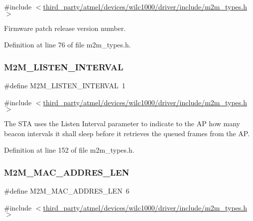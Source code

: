 {\ttfamily \#include $<$\hyperlink{m2m__types_8h}{third\+\_\+party/atmel/devices/wilc1000/driver/include/m2m\+\_\+types.\+h}$>$}

Firmware patch release version number. 

Definition at line 76 of file m2m\+\_\+types.\+h.

\mbox{\label{group__WlanDefines_gaeba577f0df70feddc9d2a3e6269ae859}} 
\subsubsection{\texorpdfstring{M2\+M\+\_\+\+L\+I\+S\+T\+E\+N\+\_\+\+I\+N\+T\+E\+R\+V\+AL}{M2M\_LISTEN\_INTERVAL}}
{\footnotesize\ttfamily \#define M2\+M\+\_\+\+L\+I\+S\+T\+E\+N\+\_\+\+I\+N\+T\+E\+R\+V\+AL~1}



{\ttfamily \#include $<$\hyperlink{m2m__types_8h}{third\+\_\+party/atmel/devices/wilc1000/driver/include/m2m\+\_\+types.\+h}$>$}

The S\+TA uses the Listen Interval parameter to indicate to the AP how many beacon intervals it shall sleep before it retrieves the queued frames from the AP. 

Definition at line 152 of file m2m\+\_\+types.\+h.

\mbox{\label{group__WlanDefines_ga6884f9d5fed2dd058a1bbf4358b5c263}} 
\subsubsection{\texorpdfstring{M2\+M\+\_\+\+M\+A\+C\+\_\+\+A\+D\+D\+R\+E\+S\+\_\+\+L\+EN}{M2M\_MAC\_ADDRES\_LEN}}
{\footnotesize\ttfamily \#define M2\+M\+\_\+\+M\+A\+C\+\_\+\+A\+D\+D\+R\+E\+S\+\_\+\+L\+EN~6}



{\ttfamily \#include $<$\hyperlink{m2m__types_8h}{third\+\_\+party/atmel/devices/wilc1000/driver/include/m2m\+\_\+types.\+h}$>$}

